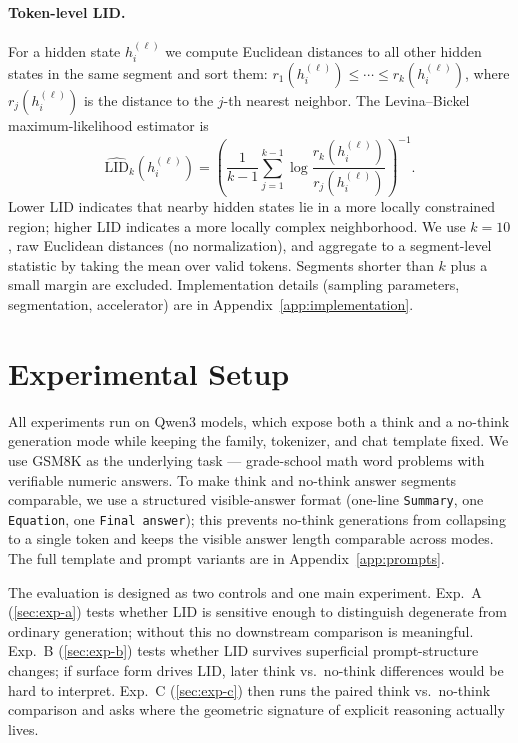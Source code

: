\documentclass{article}
\theoremstyle{plain}
\theoremstyle{definition}
\theoremstyle{remark}
\begin{document}
\paragraph{Token-level LID.} For a hidden state $h_i^{(\ell)}$ we compute Euclidean distances to all other hidden states in the same segment and sort them: $r_1(h_i^{(\ell)}) \leq \cdots \leq r_k(h_i^{(\ell)})$, where $r_j(h_i^{(\ell)})$ is the distance to the $j$-th nearest neighbor. The Levina--Bickel maximum-likelihood estimator \citep{NIPS2004_74934548} is
\begin{equation}
\widehat{\mathrm{LID}}_k(h_i^{(\ell)}) =
\left(
\frac{1}{k-1}
\sum_{j=1}^{k-1}
\log \frac{r_k(h_i^{(\ell)})}{r_j(h_i^{(\ell)})}
\right)^{-1}.
\label{eq:lid}
\end{equation}
Lower LID indicates that nearby hidden states lie in a more locally constrained region; higher LID indicates a more locally complex neighborhood. We use $k=10$, raw Euclidean distances (no normalization), and aggregate to a segment-level statistic by taking the mean over valid tokens. Segments shorter than $k$ plus a small margin are excluded. Implementation details (sampling parameters, segmentation, accelerator) are in Appendix~\ref{app:implementation}.

\section{Experimental Setup}
\label{sec:setup}

All experiments run on Qwen3 models, which expose both a think and a no-think generation mode while keeping the family, tokenizer, and chat template fixed. We use GSM8K \citep{cobbe2021trainingverifierssolvemath} as the underlying task --- grade-school math word problems with verifiable numeric answers. To make think and no-think answer segments comparable, we use a structured visible-answer format (one-line \texttt{Summary}, one \texttt{Equation}, one \texttt{Final answer}); this prevents no-think generations from collapsing to a single token and keeps the visible answer length comparable across modes. The full template and prompt variants are in Appendix~\ref{app:prompts}.

The evaluation is designed as two controls and one main experiment. Exp.\ A (\cref{sec:exp-a}) tests whether LID is sensitive enough to distinguish degenerate from ordinary generation; without this no downstream comparison is meaningful. Exp.\ B (\cref{sec:exp-b}) tests whether LID survives superficial prompt-structure changes; if surface form drives LID, later think vs.\ no-think differences would be hard to interpret. Exp.\ C (\cref{sec:exp-c}) then runs the paired think vs.\ no-think comparison and asks where the geometric signature of explicit reasoning actually lives.
\end{document}
